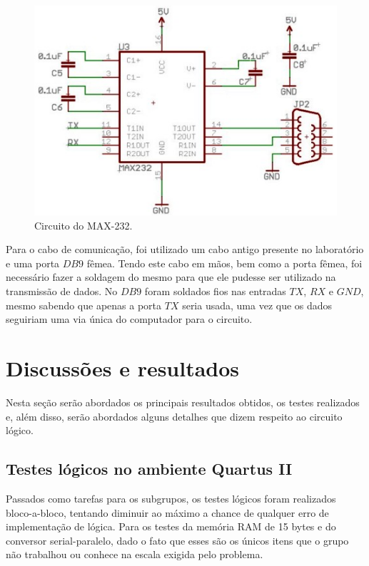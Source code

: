 \documentclass[12pt]{article}
\begin{document}
\begin{figure}[h]
\centering
\includegraphics[width=.8\textwidth]{img/232.jpg}
\caption{Circuito do MAX-232.}
\label{fig:max232}
\end{figure}

Para o cabo de comunicação, foi utilizado um cabo antigo presente no laboratório e uma porta $DB9$ fêmea. Tendo este cabo em mãos, bem como a porta fêmea, foi necessário fazer a soldagem do mesmo para que ele pudesse ser utilizado na transmissão de dados. No $DB9$ foram soldados fios nas entradas $TX$, $RX$ e $GND$, mesmo sabendo que apenas a porta $TX$ seria usada, uma vez que os dados seguiriam uma via única do computador para o circuito.

\section{Discussões e resultados}

Nesta seção serão abordados os principais resultados obtidos, os testes realizados e, além disso, serão abordados alguns detalhes que dizem respeito ao circuito lógico.

\subsection{Testes lógicos no ambiente Quartus II}

Passados como tarefas para os subgrupos, os testes lógicos foram realizados bloco-a-bloco, tentando diminuir ao máximo a chance de qualquer erro de implementação de lógica. Para os testes da memória RAM de 15 bytes e do conversor serial-paralelo, dado o fato que esses são os únicos itens que o grupo não trabalhou ou conhece na escala exigida pelo problema.
\end{document}
